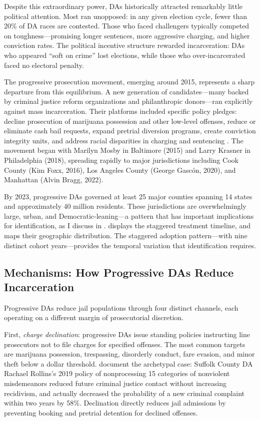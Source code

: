 \documentclass[12pt]{article}
\begin{document}
Despite this extraordinary power, DAs historically attracted remarkably little political attention. Most ran unopposed: in any given election cycle, fewer than 20\% of DA races are contested. Those who faced challengers typically competed on toughness---promising longer sentences, more aggressive charging, and higher conviction rates. The political incentive structure rewarded incarceration: DAs who appeared ``soft on crime'' lost elections, while those who over-incarcerated faced no electoral penalty.

The progressive prosecution movement, emerging around 2015, represents a sharp departure from this equilibrium. A new generation of candidates---many backed by criminal justice reform organizations and philanthropic donors---ran explicitly against mass incarceration. Their platforms included specific policy pledges: decline prosecution of marijuana possession and other low-level offenses, reduce or eliminate cash bail requests, expand pretrial diversion programs, create conviction integrity units, and address racial disparities in charging and sentencing \citep{sklansky2018changing, baumer2022da}. The movement began with Marilyn Mosby in Baltimore (2015) and Larry Krasner in Philadelphia (2018), spreading rapidly to major jurisdictions including Cook County (Kim Foxx, 2016), Los Angeles County (George Gasc\'on, 2020), and Manhattan (Alvin Bragg, 2022).

By 2023, progressive DAs governed at least 25 major counties spanning 14 states and approximately 40 million residents. These jurisdictions are overwhelmingly large, urban, and Democratic-leaning---a pattern that has important implications for identification, as I discuss in .  displays the staggered treatment timeline, and  maps their geographic distribution. The staggered adoption pattern---with nine distinct cohort years---provides the temporal variation that identification requires.

\subsection{Mechanisms: How Progressive DAs Reduce Incarceration}

Progressive DAs reduce jail populations through four distinct channels, each operating on a different margin of prosecutorial discretion.

First, \textit{charge declination}: progressive DAs issue standing policies instructing line prosecutors not to file charges for specified offenses. The most common targets are marijuana possession, trespassing, disorderly conduct, fare evasion, and minor theft below a dollar threshold. \citet{agan2023misdemeanor} document the archetypal case: Suffolk County DA Rachael Rollins's 2019 policy of nonprocessing 15 categories of nonviolent misdemeanors reduced future criminal justice contact without increasing recidivism, and actually decreased the probability of a new criminal complaint within two years by 58\%. Declination directly reduces jail admissions by preventing booking and pretrial detention for declined offenses.
\end{document}
